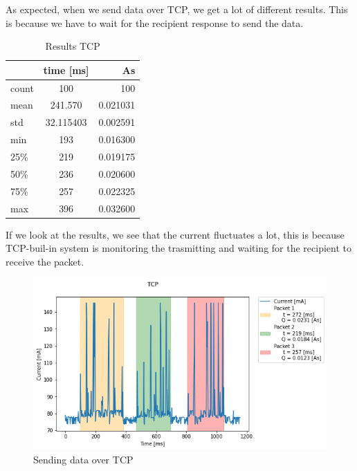 As expected, when we send data over TCP, we get a lot of different results.
This is because we have to wait for the recipient response to send the data.
\linebreak\linebreak
\begin{table}[htbp]
\begin{center}
\caption{Results TCP}
\label{tab:table1}
\renewcommand{\arraystretch}{1.8}
\begin{tabular}{l|c|r}
& \textbf{time [ms]} & \textbf{As}\\
\hline
count & 100 & 100\\
mean & 241.570 & 0.021031\\
std & 32.115403 & 0.002591\\
min & 193 & 0.016300\\
25\%  & 219 & 0.019175\\
50\% & 236 & 0.020600\\
75\%  & 257 & 0.022325\\
max & 396 & 0.032600\\
\end{tabular}
\end{center}
\end{table}
\linebreak
If we look at the results, we see that the current fluctuates a lot,
this is because TCP-buil-in system is monitoring the trasmitting 
and waiting for the recipient to receive the packet.\linebreak\linebreak
\begin{figure}[H]
\centering
\includegraphics[width = 1 \linewidth]{fig/udp_tcp/tcp_s_m.png}
\caption{Sending data over TCP}
\label{fig:tcp_s_m}
\end{figure}

